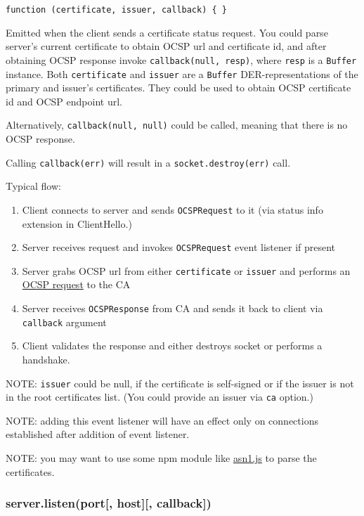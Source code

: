 \texttt{function\ (certificate,\ issuer,\ callback)\ \{\ \}}

Emitted when the client sends a certificate status request. You could
parse server's current certificate to obtain OCSP url and certificate
id, and after obtaining OCSP response invoke
\texttt{callback(null,\ resp)}, where \texttt{resp} is a \texttt{Buffer}
instance. Both \texttt{certificate} and \texttt{issuer} are a
\texttt{Buffer} DER-representations of the primary and issuer's
certificates. They could be used to obtain OCSP certificate id and OCSP
endpoint url.

Alternatively, \texttt{callback(null,\ null)} could be called, meaning
that there is no OCSP response.

Calling \texttt{callback(err)} will result in a
\texttt{socket.destroy(err)} call.

Typical flow:

\begin{enumerate}
\def\labelenumi{\arabic{enumi}.}
\itemsep1pt\parskip0pt
\item
  Client connects to server and sends \texttt{OCSPRequest} to it (via
  status info extension in ClientHello.)
\item
  Server receives request and invokes \texttt{OCSPRequest} event
  listener if present
\item
  Server grabs OCSP url from either \texttt{certificate} or
  \texttt{issuer} and performs an
  \href{http://en.wikipedia.org/wiki/OCSP_stapling}{OCSP request} to the
  CA
\item
  Server receives \texttt{OCSPResponse} from CA and sends it back to
  client via \texttt{callback} argument
\item
  Client validates the response and either destroys socket or performs a
  handshake.
\end{enumerate}

NOTE: \texttt{issuer} could be null, if the certificate is self-signed
or if the issuer is not in the root certificates list. (You could
provide an issuer via \texttt{ca} option.)

NOTE: adding this event listener will have an effect only on connections
established after addition of event listener.

NOTE: you may want to use some npm module like
\href{http://npmjs.org/package/asn1.js}{asn1.js} to parse the
certificates.

\subsubsection{server.listen(port{[}, host{]}{[},
callback{]})}\label{server.listenport-host-callback}

